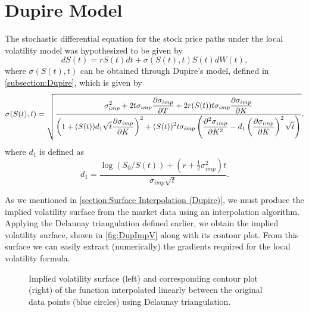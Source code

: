 \section{Dupire Model}
The stochastic differential equation for the stock price paths under the local volatility model was hypothesized to be given by
\begin{equation}\label{dupmodds}
dS(t)=rS(t)dt+\sigma(S(t),t)S(t)dW(t),
\end{equation}
\noindent where $\sigma(S(t),t)$ can be obtained through Dupire's model, defined in \autoref{subsection:Dupire}, which is given by
\begin{equation}\label{dupmodds2}
\sigma(S(t),t)=\sqrt{\frac{\displaystyle\sigma_{imp}^2+2t\sigma_{imp}\pdv{\sigma_{imp}}{T}+2r(S(t))t\sigma_{imp}\pdv{\sigma_{imp}}{K}}{\displaystyle\left(1+(S(t))d_1\sqrt{t}\pdv{\sigma_{imp}}{K}\right)^2+(S(t))^2t\sigma_{imp}\left(\pdv{^2\sigma_{imp}}{K^2}-d_1\left(\pdv{\sigma_{imp}}{K}\right)^2\sqrt{t}\right)}},
\end{equation}
\noindent where $d_1$ is defined as
\begin{equation}
d_1=\frac{\log(S_0/S(t))+\left(r+\frac{1}{2}\sigma_{imp}^2\right)t}{\sigma_{imp}\sqrt{t}}.
\end{equation}

As we mentioned in \autoref{section:Surface Interpolation (Dupire)}, we must produce the implied volatility surface from the market data using an interpolation algorithm. Applying the Delaunay triangulation defined earlier, we obtain the implied volatility surface, shown in \autoref{fig:DupImpV} along with its contour plot.
From this surface we can easily extract (numerically) the gradients required for the local volatility formula.



\begin{figure}[H]
  \begin{subfigmatrix}{2}
  \end{subfigmatrix}
    \caption[Implied volatility surface and corresponding contour plot of the function interpolated linearly between the original data points using Delaunay triangulation.]{Implied volatility surface (left) and corresponding contour plot (right) of the function interpolated linearly between the original data points (blue circles) using Delaunay triangulation.}\label{fig:DupImpV}
\end{figure}   


